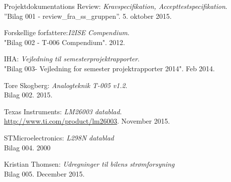 	\fancyhead[CE,CO]{}
\renewcommand{\bibname}{Litteraturliste}
\begin{thebibliography}{2}

 Projektdokumentations Review: \textit{Kravspecifikation, Accepttestspecifikation}.\\
''Bilag 001 - review\_fra\_ss\_gruppen''. 5. oktober 2015.

 Forskellige forfattere:\textit{I2ISE Compendium}. \\
"Bilag 002 - T-006 Compendium". 2012.

 IHA: \textit{Vejledning til semesterprojektrapporter}. \\
"Bilag 003- Vejledning for semester projektrapporter 2014". Feb 2014.

 Tore Skogberg: \textit{Analogteknik T-005 v1.2}.\\
Bilag 002. 2015.

 Texas Instruments: \textit{LM26003 datablad}. \\
\url{http://www.ti.com/product/lm26003}. November 2015.

 STMicroelectronics: \textit{L298N datablad} \\
Bilag 004. 2000

 Kristian Thomsen: \textit{Udregninger til bilens strømforsyning} \\
Bilag 005. December 2015.


\end{thebibliography}